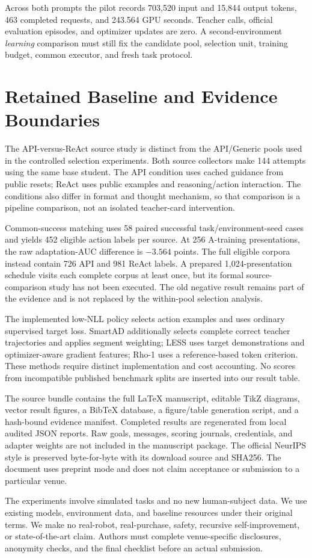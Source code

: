 Across both prompts the pilot records 703,520 input and 15,844 output tokens, 463 completed requests, and 243.564 GPU seconds. Teacher calls, official evaluation episodes, and optimizer updates are zero. A second-environment \emph{learning} comparison must still fix the candidate pool, selection unit, training budget, common executor, and fresh task protocol.

\clearpage
\section{Retained Baseline and Evidence Boundaries}
\label{app:baseline}
The API-versus-ReAct source study is distinct from the API/Generic pools used in the controlled selection experiments. Both source collectors make 144 attempts using the same base student. The API condition uses cached guidance from public resets; ReAct uses public examples and reasoning/action interaction. The conditions also differ in format and thought mechanism, so that comparison is a pipeline comparison, not an isolated teacher-card intervention.

Common-success matching uses 58 paired successful task/environment-seed cases and yields 452 eligible action labels per source. At 256 A-training presentations, the raw adaptation-AUC difference is $-3.564$ points. The full eligible corpora instead contain 726 API and 981 ReAct labels. A prepared 1,024-presentation schedule visits each complete corpus at least once, but its formal source-comparison study has not been executed. The old negative result remains part of the evidence and is not replaced by the within-pool selection analysis.

The implemented low-NLL policy selects action examples and uses ordinary supervised target loss. SmartAD additionally selects complete correct teacher trajectories and applies segment weighting; LESS uses target demonstrations and optimizer-aware gradient features; Rho-1 uses a reference-based token criterion. These methods require distinct implementation and cost accounting. No scores from incompatible published benchmark splits are inserted into our result table.

The source bundle contains the full \LaTeX{} manuscript, editable TikZ diagrams, vector result figures, a BibTeX database, a figure/table generation script, and a hash-bound evidence manifest. Completed results are regenerated from local audited JSON reports. Raw goals, messages, scoring journals, credentials, and adapter weights are not included in the manuscript package. The official NeurIPS style is preserved byte-for-byte with its download source and SHA256. The document uses preprint mode and does not claim acceptance or submission to a particular venue.

The experiments involve simulated tasks and no new human-subject data. We use existing models, environment data, and baseline resources under their original terms. We make no real-robot, real-purchase, safety, recursive self-improvement, or state-of-the-art claim. Authors must complete venue-specific disclosures, anonymity checks, and the final checklist before an actual submission.
